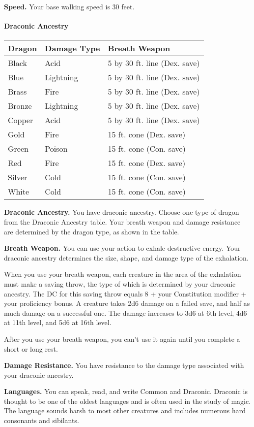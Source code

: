 \documentclass[
]{article}
\begin{document}
\textbf{Speed.} Your base walking speed is 30 feet.

\hypertarget{draconic-ancestry}{%
\paragraph{Draconic Ancestry}\label{draconic-ancestry}}

\begin{longtable}[]{@{}lll@{}}
\toprule
Dragon & Damage Type & Breath Weapon\tabularnewline
\midrule
\endhead
Black & Acid & 5 by 30 ft. line (Dex. save)\tabularnewline
Blue & Lightning & 5 by 30 ft. line (Dex. save)\tabularnewline
Brass & Fire & 5 by 30 ft. line (Dex. save)\tabularnewline
Bronze & Lightning & 5 by 30 ft. line (Dex. save)\tabularnewline
Copper & Acid & 5 by 30 ft. line (Dex. save)\tabularnewline
Gold & Fire & 15 ft. cone (Dex. save)\tabularnewline
Green & Poison & 15 ft. cone (Con. save)\tabularnewline
Red & Fire & 15 ft. cone (Dex. save)\tabularnewline
Silver & Cold & 15 ft. cone (Con. save)\tabularnewline
White & Cold & 15 ft. cone (Con. save)\tabularnewline
\bottomrule
\end{longtable}

\textbf{Draconic Ancestry.} You have draconic ancestry. Choose one type
of dragon from the Draconic Ancestry table. Your breath weapon and
damage resistance are determined by the dragon type, as shown in the
table.

\textbf{Breath Weapon.} You can use your action to exhale destructive
energy. Your draconic ancestry determines the size, shape, and damage
type of the exhalation.

When you use your breath weapon, each creature in the area of the
exhalation must make a saving throw, the type of which is determined by
your draconic ancestry. The DC for this saving throw equals 8 + your
Constitution modifier + your proficiency bonus. A creature takes 2d6
damage on a failed save, and half as much damage on a successful one.
The damage increases to 3d6 at 6th level, 4d6 at 11th level, and 5d6 at
16th level.

After you use your breath weapon, you can't use it again until you
complete a short or long rest.

\textbf{Damage Resistance.} You have resistance to the damage type
associated with your draconic ancestry.

\textbf{Languages.} You can speak, read, and write Common and Draconic.
Draconic is thought to be one of the oldest languages and is often used
in the study of magic. The language sounds harsh to most other creatures
and includes numerous hard consonants and sibilants.
\end{document}
